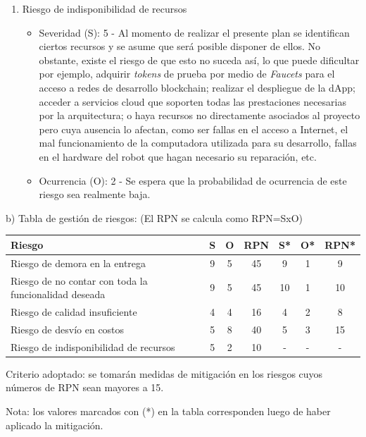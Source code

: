 \documentclass[
11pt, %
]{charter}
\begin{document}
\begin{enumerate}
\item Riesgo de indisponibilidad de recursos
\begin{itemize}
	\item Severidad (S): 5 - Al momento de realizar el presente plan se identifican ciertos recursos y se asume que será posible disponer de ellos. No obstante, existe el riesgo de que esto no suceda así, lo que puede dificultar por ejemplo, adquirir \textit{tokens} de prueba por medio de \textit{Faucets} para el acceso a redes de desarrollo blockchain; realizar el despliegue de la dApp; acceder a servicios cloud que soporten todas las prestaciones necesarias por la arquitectura; o haya recursos no directamente asociados al proyecto pero cuya ausencia lo afectan, como ser fallas en el acceso a Internet, el mal funcionamiento de la computadora utilizada para su desarrollo, fallas en el hardware del robot que hagan necesario su reparación, etc.
	\item Ocurrencia (O): 2 - Se espera que la probabilidad de ocurrencia de este riesgo sea realmente baja.
\end{itemize}

\end{enumerate}

b) Tabla de gestión de riesgos:      (El RPN se calcula como RPN=SxO)

\begin{table}[htpb]
\centering
\begin{tabularx}{\linewidth}{@{}|X|c|c|c|c|c|c|@{}}
\hline
\rowcolor[HTML]{C0C0C0}
Riesgo 													& S & O & RPN & S* & O* & RPN* \\ \hline
Riesgo de demora en la entrega							& 9 & 5 & 45 &	9  &  1  & 9    \\ \hline
Riesgo de no contar con toda la funcionalidad deseada		& 9 & 5 & 45 & 	10  & 1 &  10    \\ \hline
Riesgo de calidad insuficiente							& 4 & 4 & 16 &  	4 &  2 &   8  \\ \hline
Riesgo de desvío en costos								& 5 & 8 & 40 & 	5  & 3  &  15   \\ \hline
Riesgo de indisponibilidad de recursos					& 5 & 2 & 10 & 	-  & -  &   -   \\ \hline
\end{tabularx}%
\end{table}

Criterio adoptado: se tomarán medidas de mitigación en los riesgos cuyos números de RPN sean mayores a 15.

Nota: los valores marcados con (*) en la tabla corresponden luego de haber aplicado la mitigación.
\end{document}
